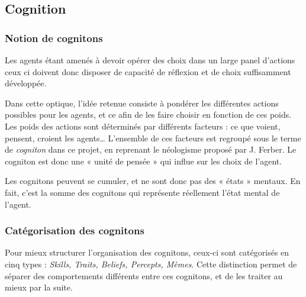 \documentclass[a4paper,oneside,12 pt]{article}
\begin{document}
\subsection{Cognition}

\subsubsection{Notion de cognitons}

	Les agents étant amenés à devoir opérer des choix dans un large panel d'actions ceux ci doivent donc disposer de capacité de réflexion et de choix suffisamment développée.
	
	Dans cette optique, l'idée retenue consiste à pondérer les différentes actions possibles pour les agents, et  ce afin de les faire choisir en fonction de ces poids. 
	Les poids des actions sont déterminés par différents facteurs : ce que voient, pensent, croient les agents… L'ensemble de ces facteurs est regroupé sous le terme de \textit{cogniton} dans ce projet, en reprenant le néologisme proposé par J. Ferber. Le cogniton est donc une « unité de pensée » qui influe sur les choix de l'agent. 	
	
	Les cognitons peuvent se cumuler, et ne sont donc pas des « états » mentaux. En fait, c'est la somme des cognitons qui représente réellement l'état mental de l'agent.
	
\subsubsection{Catégorisation des cognitons}

	Pour mieux structurer l'organisation des cognitons, ceux-ci sont catégorisés en cinq types :\textit{ Skills, Traits, Beliefs, Percepts, Mèmes}. Cette distinction permet de séparer des comportements différents entre ces cognitons, et de les traiter au mieux par la suite.
	
\end{document}
